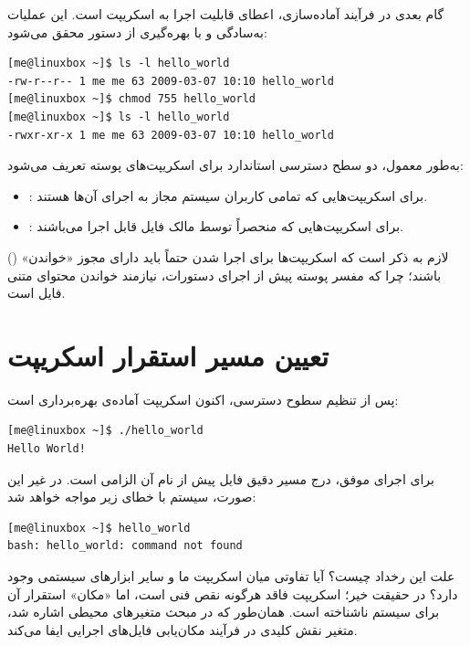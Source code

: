گام بعدی در فرآیند آماده‌سازی، اعطای قابلیت اجرا به اسکریپت است. این عملیات به‌سادگی و با بهره‌گیری از دستور  محقق می‌شود:

\begin{latin}
\begin{lstlisting}
[me@linuxbox ~]$ ls -l hello_world
-rw-r--r-- 1 me me 63 2009-03-07 10:10 hello_world
[me@linuxbox ~]$ chmod 755 hello_world
[me@linuxbox ~]$ ls -l hello_world
-rwxr-xr-x 1 me me 63 2009-03-07 10:10 hello_world
\end{lstlisting}
\end{latin}

به‌طور معمول، دو سطح دسترسی استاندارد برای اسکریپت‌های پوسته تعریف می‌شود:

\begin{itemize}
  \item {}: برای اسکریپت‌هایی که تمامی کاربران سیستم مجاز به اجرای آن‌ها هستند.
  \item {}: برای اسکریپت‌هایی که منحصراً توسط مالک فایل قابل اجرا می‌باشند.
\end{itemize}

لازم به ذکر است که اسکریپت‌ها برای اجرا شدن حتماً باید دارای مجوز «خواندن» () باشند؛ چرا که مفسر پوسته پیش از اجرای دستورات، نیازمند خواندن محتوای متنی فایل است.

\section{تعیین مسیر استقرار اسکریپت}

پس از تنظیم سطوح دسترسی، اکنون اسکریپت آماده‌ی بهره‌برداری است:

\begin{latin}
\begin{lstlisting}
[me@linuxbox ~]$ ./hello_world
Hello World!
\end{lstlisting}
\end{latin}

برای اجرای موفق، درج مسیر دقیق فایل پیش از نام آن الزامی است. در غیر این صورت، سیستم با خطای زیر مواجه خواهد شد:

\begin{latin}
\begin{lstlisting}
[me@linuxbox ~]$ hello_world
bash: hello_world: command not found
\end{lstlisting}
\end{latin}

علت این رخداد چیست؟ آیا تفاوتی میان اسکریپت ما و سایر ابزارهای سیستمی وجود دارد؟ در حقیقت خیر؛ اسکریپت فاقد هرگونه نقص فنی است، اما «مکان» استقرار آن برای سیستم ناشناخته است. همان‌طور که در مبحث متغیرهای محیطی اشاره شد، متغیر  نقش کلیدی در فرآیند مکان‌یابی فایل‌های اجرایی ایفا می‌کند.

